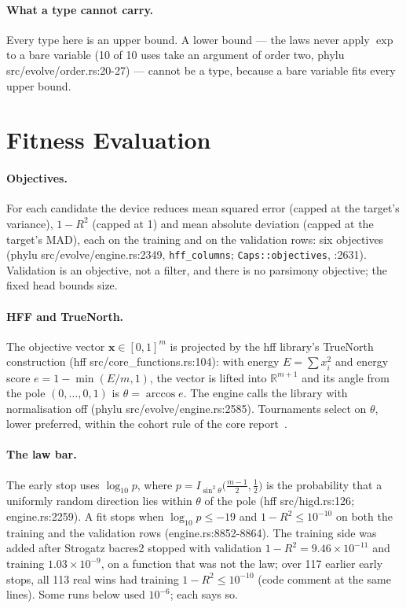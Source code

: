 \documentclass[sigconf,nonacm]{acmart}
\newcommand{\src}[1]{{\small\ttfamily #1}}
\begin{document}
\paragraph{What a type cannot carry.} Every type here is an upper bound. A
lower bound --- the laws never apply $\exp$ to a bare variable (10 of 10 uses
take an argument of order two, \src{phylu src/\allowbreak{}evolve/\allowbreak{}order.\allowbreak{}rs:20-27}) --- cannot
be a type, because a bare variable fits every upper bound.

\section{Fitness Evaluation}
\label{sec:fitness}

\paragraph{Objectives.} For each candidate the device reduces mean squared
error (capped at the target's variance), $1-R^2$ (capped at 1) and mean
absolute deviation (capped at the target's MAD), each on the training and on
the validation rows: six objectives
(\src{phylu src/\allowbreak{}evolve/\allowbreak{}engine.\allowbreak{}rs:2349}, \texttt{hff\_columns};
\texttt{Caps::objectives}, \src{:2631}). Validation is an objective, not a
filter, and there is no parsimony objective; the fixed head bounds size.

\paragraph{HFF and TrueNorth.} The objective vector $\mathbf{x}\in[0,1]^m$ is
projected by the hff library's TrueNorth construction
(\src{hff src/\allowbreak{}core\_\allowbreak{}functions.\allowbreak{}rs:104}): with energy $E=\sum x_i^2$ and energy
score $e=1-\min(E/m,1)$, the vector is lifted into $\mathbb{R}^{m+1}$ and its
angle from the pole $(0,\dots,0,1)$ is $\theta=\arccos e$. The engine calls the
library with normalisation off (\src{phylu src/\allowbreak{}evolve/\allowbreak{}engine.\allowbreak{}rs:2585}).
Tournaments select on $\theta$, lower preferred, within the cohort rule of the
core report~\cite{morgan_core}.

\paragraph{The law bar.} The early stop uses $\log_{10} p$, where
$p=I_{\sin^2\theta}\big(\tfrac{m-1}{2},\tfrac12\big)$ is the probability that a
uniformly random direction lies within $\theta$ of the pole
(\src{hff src/\allowbreak{}higd.\allowbreak{}rs:126}; \src{engine.\allowbreak{}rs:2259}). A fit stops when
$\log_{10}p\le-19$ and $1-R^2\le10^{-10}$ on both the training and the
validation rows (\src{engine.\allowbreak{}rs:8852-8864}). The training side was added after
Strogatz bacres2 stopped with validation $1-R^2=9.46\times10^{-11}$ and
training $1.03\times10^{-9}$, on a function that was not the law; over 117
earlier early stops, all 113 real wins had training $1-R^2\le10^{-10}$ (code
comment at the same lines). Some runs below used $10^{-6}$; each says so.
\end{document}
